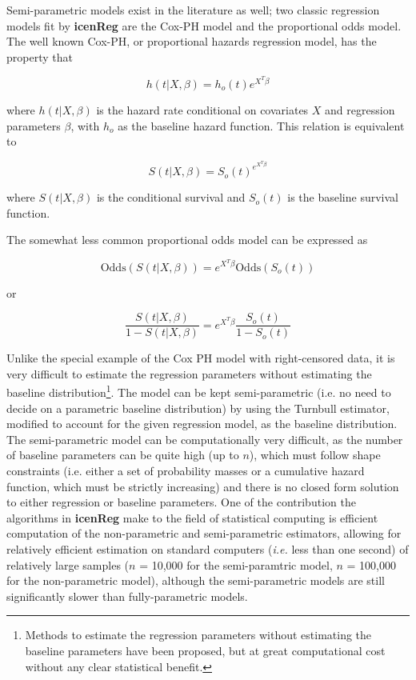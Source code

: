 \documentclass[a4paper]{article}
\begin{document}
Semi-parametric models exist in the literature as well; two classic regression models fit by {\bf icenReg} are the Cox-PH model and the proportional odds model. The well known Cox-PH, or proportional hazards regression model, has the property that
  
\[ h(t | X, \beta) = h_o(t) e^{X^T \beta} \]
  
where $h(t | X, \beta)$ is the hazard rate conditional on covariates $X$ and regression parameters $\beta$, with $h_o$ as the baseline hazard function. This relation is equivalent to 

\[S(t | X, \beta) = S_o(t)^{e^{X^T \beta} } \]
  
where $S(t| X, \beta)$ is the conditional survival and $S_o(t)$ is the baseline survival function. 
  
The somewhat less common proportional odds model can be expressed as
  
\[\text{Odds}(S(t | X, \beta)) = e^{X^T \beta} \text{Odds}(S_o(t)) \]
\begin{center}  
  or
\end{center}
\[ \frac{S(t | X, \beta)} {1 - S(t | X, \beta) } = e^{X^T \beta}\frac{S_o(t)} {1 - S_o(t)} \]
  
  
Unlike the special example of the Cox PH model with right-censored data, it is very difficult to estimate the regression parameters without estimating the baseline distribution\footnote{Methods to estimate the regression parameters without estimating the baseline parameters have been proposed, but at great computational cost without any clear statistical benefit.}. The model can be kept semi-parametric (i.e. no need to decide on a parametric baseline distribution) by using the Turnbull estimator, modified to account for the given regression model, as the baseline distribution. The semi-parametric model can be computationally very difficult, as the number of baseline parameters can be quite high (up to $n$), which must follow shape constraints (i.e. either a set of probability masses or a cumulative hazard function, which must be strictly increasing) and there is no closed form solution to either regression or baseline parameters. One of the contribution the algorithms in {\bf icenReg} make to the field of statistical computing is efficient computation of the non-parametric and semi-parametric estimators, allowing for relatively efficient estimation on standard computers (\emph{i.e.} less than one second) of relatively large samples ($n$ = 10,000 for the semi-paramtric model, $n$ = 100,000 for the non-parametric model), although the semi-parametric models are still significantly slower than fully-parametric models. 
  
\end{document}
